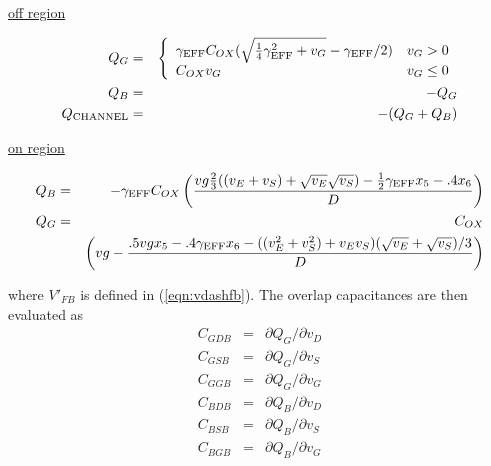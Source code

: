 {\noindent \underline{off region}

\begin{eqnarray}
Q_G &=& \left\{ \begin{array}{ll}
       \gamma_{\ms{EFF}} C_{OX}
       ( \sqrt{\frac{1}{4}\gamma_{\ms{EFF}}^2 + v_G} - \gamma_{\ms{EFF}}/2 )
                                      & v_G > 0 \\
       C_{OX} v_G                     & v_G \le 0
       \end{array} \right. %
       \\
  Q_B &=& -Q_G\\
  Q_{\ms{CHANNEL}} &=& -( Q_G + Q_B )
\end{eqnarray}


\noindent \underline{on region}


\begin{eqnarray}
    Q_B &=& -\gamma_{\mbox{\scriptsize EFF}} C_{OX}
          \left( {{\textstyle
             vg \frac{2}{3} ( (v_E+v_S) + \sqrt{v_E}\sqrt{v_S} )
             - \frac{1}{2} \gamma_{\mbox{\scriptsize EFF}} x_5
             - .4 x_6 } \over {\textstyle D}} \right) \\
    Q_G &=& C_{OX} \nonumber \\
        &&   \left( vg - {{\textstyle .5 vg x_5 - .4 \gamma_{\mbox{\scriptsize EFF}} x_6
             - ((v_E^2+v_S^2) + v_Ev_S)(\sqrt{v_E}+\sqrt{v_S})/3
 } \over{\textstyle D}} \right)
\end{eqnarray}

where $V'_{FB}$ is defined in (\ref{eqn:vdashfb}).
\noindent The overlap capacitances are then evaluated as
\begin{eqnarray}
    C_{GDB}  &=& \partial Q_G / \partial v_D\\ 
    C_{GSB}  &=& \partial Q_G / \partial v_S\\ 
    C_{GGB}  &=& \partial Q_G / \partial v_G\\ 
    C_{BDB}  &=& \partial Q_B / \partial v_D\\ 
    C_{BSB}  &=& \partial Q_B / \partial v_S\\ 
    C_{BGB}  &=& \partial Q_B / \partial v_G
\end{eqnarray}

}
